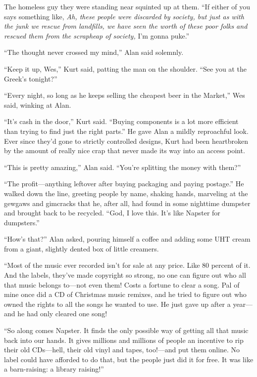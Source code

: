 The homeless guy they were standing near squinted up at them.  ``If
either of you says something like, \textit{Ah, these people were
discarded by society, but just as with the junk we rescue from
landfills, we have seen the worth of these poor folks and rescued them
from the scrapheap of society,} I'm gonna puke.''

``The thought never crossed my mind,'' Alan said solemnly.

``Keep it up, Wes,'' Kurt said, patting the man on the shoulder. 
``See you at the Greek's tonight?''

``Every night, so long as he keeps selling the cheapest beer in the
Market,'' Wes said, winking at Alan.

``It's cash in the door,'' Kurt said.  ``Buying components is a lot
more efficient than trying to find just the right parts.'' He gave
Alan a mildly reproachful look.  Ever since they'd gone to strictly
controlled designs, Kurt had been heartbroken by the amount of really
nice crap that never made its way into an access point.

``This is pretty amazing,'' Alan said.  ``You're splitting the money
with them?''

``The profit---anything leftover after buying packaging and paying
postage.'' He walked down the line, greeting people by name, shaking
hands, marveling at the gewgaws and gimcracks that he, after all, had
found in some nighttime dumpster and brought back to be recycled. 
``God, I love this.  It's like Napster for dumpsters.''

``How's that?'' Alan asked, pouring himself a coffee and adding some
UHT cream from a giant, slightly dented box of little creamers.

``Most of the music ever recorded isn't for sale at any price.  Like
80 percent of it.  And the labels, they've made copyright so strong,
no one can figure out who all that music belongs to---not even them! 
Costs a fortune to clear a song.  Pal of mine once did a CD of
Christmas music remixes, and he tried to figure out who owned the
rights to all the songs he wanted to use.  He just gave up after a
year---and he had only cleared one song!

``So along comes Napster.  It finds the only possible way of getting
all that music back into our hands.  It gives millions and millions of
people an incentive to rip their old CDs---hell, their old vinyl and
tapes, too!---and put them online.  No label could have afforded to do
that, but the people just did it for free.  It was like a
barn-raising:  a library raising!''

